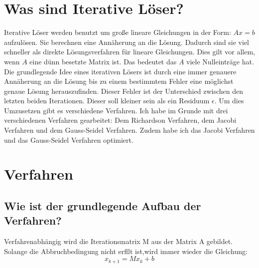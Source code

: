 \documentclass[a4paper, 11pt]{article}
\begin{document}
\section{Was sind Iterative L\"oser?}
Iterative L\"oser werden benutzt um gro\ss{}e lineare Gleichungen in der Form: \(Ax=b\) aufzul\"osen. Sie berechnen eine Ann\"aherung an die L\"osung. Dadurch sind sie viel schneller als direkte L\"osungsverfahren f\"ur lineare Gleichungen. 
Dies gilt vor allem, wenn \(A\) eine d\"unn besetzte Matrix ist. Das bedeutet das \(A\) viele Nulleintr\"age hat.
Die grundlegende Idee eines iterativen L\"osers ist durch eine immer genauere Ann\"aherung an die L\"osung bis zu einem bestimmtem Fehler eine m\"oglichst genaue L\"osung herauszufinden. 
Dieser Fehler ist der Unterschied zwischen den letzten beiden Iterationen. Dieser soll kleiner sein als ein Residuum $\epsilon$.
Um dies Umzusetzen gibt es verschiedene Verfahren. Ich habe im Grunde mit drei verschiedenen Verfahren gearbeitet: Dem Richardson Verfahren, dem Jacobi Verfahren und dem Gauss-Seidel Verfahren. 
Zudem habe ich das Jacobi Verfahren und das Gauss-Seidel Verfahren optimiert.

\newpage

\section{Verfahren}

\subsection{Wie ist der grundlegende Aufbau der Verfahren?}
Verfahrenabh\"angig wird die Iterationsmatrix M aus der Matrix A gebildet. Solange die Abbruchbedingung nicht erfllt ist,wird immer wieder die Gleichung: \begin{equation}x_{k+1}=Mx_{k}+b\end{equation}
\end{document}
